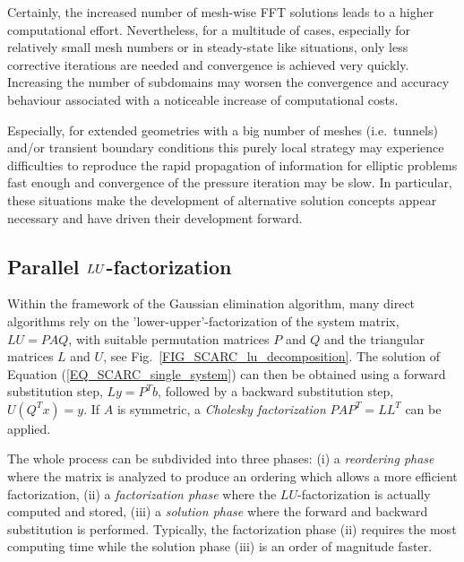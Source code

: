 Certainly, the increased number of mesh-wise FFT solutions leads to a higher computational effort. Nevertheless, for a multitude of cases, especially for relatively small mesh numbers or in steady-state like situations, only less corrective iterations are needed and convergence is achieved very quickly.
Increasing the number of subdomains may worsen the convergence and accuracy behaviour associated with a noticeable increase of computational costs.

Especially, for extended geometries with a big number of meshes (i.e.\ tunnels) and/or transient boundary conditions this purely local strategy may experience difficulties to reproduce the rapid propagation of information for elliptic problems fast enough and convergence of the pressure iteration may be slow.
In particular, these situations make the development of alternative solution concepts appear necessary and have driven their development forward.

\subsection{Parallel $\boldmath{LU}$-factorization}
\label{SEC_SCARC_lu_decomposition}
Within the framework of the Gaussian elimination algorithm, many direct algorithms rely on the 'lower-upper'-factorization of the system matrix, $LU = PAQ$, 
with suitable permutation matrices $P$ and $Q$ and the triangular matrices $L$ and $U$, see Fig.~\ref{FIG_SCARC_lu_decomposition}. 
The solution of Equation (\ref{EQ_SCARC_single_system}) can then be obtained using a forward substitution step, $Ly=P^Tb$, followed by a backward substitution step, $U(Q^Tx)=y$.
If $A$ is symmetric, a {\it Cholesky factorization} $PAP^T=LL^T$ can be applied.

The whole process can be subdivided into three phases: 
(i) a {\it reordering phase}  where the matrix is analyzed to produce an ordering which allows a more efficient factorization,
(ii) a {\it factorization phase} where the $LU$-factorization is actually computed and stored, 
(iii) a {\it solution phase} where the forward and backward substitution is performed.
Typically, the factorization phase (ii) requires the most computing time while the solution phase (iii) is an order of magnitude faster.

